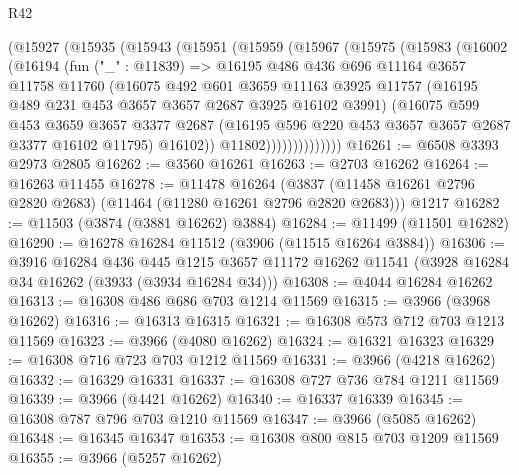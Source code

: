 \begin{lexlean}{R42}
\begin{coremodule}
          (@15927
            (@15935
              (@15943
                (@15951
                  (@15959
                    (@15967
                      (@15975
                        (@15983
                          (@16002
                            (@16194
                              (fun ("_" : @11839) =>
                              @16195
                                @486
                                @436
                                @696
                                @11164
                                @3657
                                @11758
                                @11760
                                (@16075
                                  @492
                                  @601
                                  @3659
                                  @11163
                                  @3925
                                  @11757
                                  (@16195 @489 @231 @453 @3657 @3657 @2687 @3925 @16102 @3991)
                                  (@16075
                                    @599
                                    @453
                                    @3659
                                    @3657
                                    @3377
                                    @2687
                                    (@16195 @596 @220 @453 @3657 @3657 @2687 @3377 @16102 @11795)
                                    @16102))
                                @11802))))))))))))))
@16261 := @6508 @3393 @2973 @2805
@16262 := @3560 @16261
@16263 := @2703 @16262
@16264 := @16263 @11455
@16278 := @11478
    @16264
    (@3837 (@11458 @16261 @2796 @2820 @2683) (@11464 (@11280 @16261 @2796 @2820 @2683)))
    @1217
@16282 := @11503 (@3874 (@3881 @16262) @3884)
@16284 := @11499 (@11501 @16282)
@16290 := @16278 @16284 @11512 (@3906 (@11515 @16264 @3884))
@16306 := @3916
    @16284
    @436
    @445
    @1215
    @3657
    @11172
    @16262
    @11541
    (@3928 @16284 @34 @16262 (@3933 (@3934 @16284 @34)))
@16308 := @4044 @16284 @16262
@16313 := @16308 @486 @686 @703 @1214 @11569
@16315 := @3966 (@3968 @16262)
@16316 := @16313 @16315
@16321 := @16308 @573 @712 @703 @1213 @11569
@16323 := @3966 (@4080 @16262)
@16324 := @16321 @16323
@16329 := @16308 @716 @723 @703 @1212 @11569
@16331 := @3966 (@4218 @16262)
@16332 := @16329 @16331
@16337 := @16308 @727 @736 @784 @1211 @11569
@16339 := @3966 (@4421 @16262)
@16340 := @16337 @16339
@16345 := @16308 @787 @796 @703 @1210 @11569
@16347 := @3966 (@5085 @16262)
@16348 := @16345 @16347
@16353 := @16308 @800 @815 @703 @1209 @11569
@16355 := @3966 (@5257 @16262)

\end{coremodule}
\end{lexlean}
